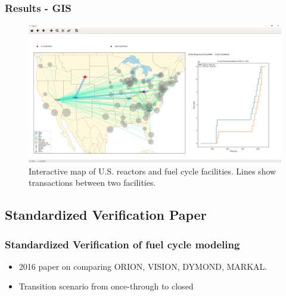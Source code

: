 \begin{frame}
    \frametitle{Results - GIS}
    \begin{figure}[htbp!]
        \begin{center}
                \includegraphics[width=.8\textwidth]{./images/sim_output/us/map.png}
        \end{center}
    \caption{Interactive map of U.S. reactors and fuel cycle
     facilities. Lines show transactions between two facilities.}
    \end{figure}
\end{frame}

\subsection{Standardized Verification Paper}

\begin{frame}
    \frametitle{Standardized Verification of fuel cycle modeling}
    \begin{itemize}
        \item 2016 paper on comparing ORION, VISION, DYMOND, MARKAL.
        \item Transition scenario from once-through to closed
    \end{itemize}
\end{frame}


